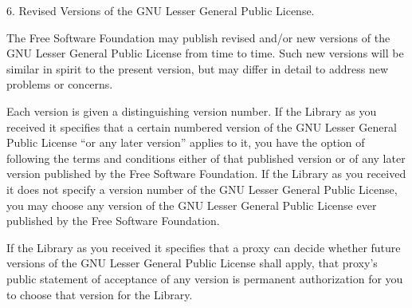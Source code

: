 {\begin{multicols}{4}
6. Revised Versions of the GNU Lesser General Public License.

The Free Software Foundation may publish revised and/or new versions of the GNU Lesser General Public License from time to time. Such new versions will be similar in spirit to the present version, but may differ in detail to address new problems or concerns.

Each version is given a distinguishing version number. If the Library as you received it specifies that a certain numbered version of the GNU Lesser General Public License “or any later version” applies to it, you have the option of following the terms and conditions either of that published version or of any later version published by the Free Software Foundation. If the Library as you received it does not specify a version number of the GNU Lesser General Public License, you may choose any version of the GNU Lesser General Public License ever published by the Free Software Foundation.

If the Library as you received it specifies that a proxy can decide whether future versions of the GNU Lesser General Public License shall apply, that proxy's public statement of acceptance of any version is permanent authorization for you to choose that version for the Library.
\end{multicols}
}
\pagebreak


